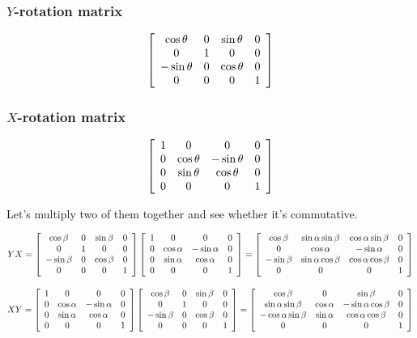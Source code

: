 \documentclass[11pt]{article}
\begin{document}
\begin{spacing}{1.2}
\subsubsection{$Y$-rotation matrix}

$$
\left[
\begin{array}{cccc}
	\cos \theta & 0 & \sin \theta & 0 \cr
	0 & 1 & 0 & 0 \cr
	-\sin \theta & 0  & \cos \theta & 0 \cr
	0 & 0 & 0 & 1 \cr
\end{array}
\right]
$$

\subsubsection{$X$-rotation matrix}

$$
\left[
\begin{array}{cccc}
	1 & 0 & 0 & 0 \cr
	0 & \cos \theta & -\sin \theta & 0 \cr
	0 & \sin \theta & \cos \theta & 0 \cr
	0 & 0 & 0 & 1 \cr
\end{array}
\right]
$$

Let's multiply two of them together and see whether it's commutative.  

$$YX = 
\left[
\begin{array}{cccc}
	\cos \beta & 0 & \sin \beta & 0 \cr
	0 & 1 & 0 & 0 \cr
	-\sin \beta & 0  & \cos \beta & 0 \cr
	0 & 0 & 0 & 1 \cr
\end{array}
\right]
\left[
\begin{array}{cccc}
	1 & 0 & 0 & 0 \cr
	0 & \cos \alpha & -\sin \alpha & 0 \cr
	0 & \sin \alpha & \cos \alpha & 0 \cr
	0 & 0 & 0 & 1 \cr
\end{array}
\right]
=\left[
\begin{array}{cccc}
	\cos \beta & \sin \alpha \sin \beta & \cos \alpha \sin \beta & 0 \cr
	0 & \cos \alpha & -\sin \alpha & 0 \cr
	-\sin \beta & \sin \alpha \cos \beta & \cos \alpha \cos \beta & 0 \cr
	0 & 0 & 0 & 1 \cr
\end{array}
\right]
$$

$$XY = 
\left[
\begin{array}{cccc}
	1 & 0 & 0 & 0 \cr
	0 & \cos \alpha & -\sin \alpha & 0 \cr
	0 & \sin \alpha & \cos \alpha & 0 \cr
	0 & 0 & 0 & 1 \cr
\end{array}
\right]
\left[
\begin{array}{cccc}
	\cos \beta & 0 & \sin \beta & 0 \cr
	0 & 1 & 0 & 0 \cr
	-\sin \beta & 0  & \cos \beta & 0 \cr
	0 & 0 & 0 & 1 \cr
\end{array}
\right]
=\left[
\begin{array}{cccc}
	\cos \beta & 0 & \sin \beta & 0 \cr
	\sin \alpha \sin \beta & \cos \alpha & -\sin \alpha \cos \beta & 0 \cr
	-\cos \alpha \sin \beta & \sin \alpha & \cos \alpha \cos \beta & 0 \cr
	0 & 0 & 0 & 1 \cr
\end{array}
\right]
$$




\end{spacing}
\end{document}
